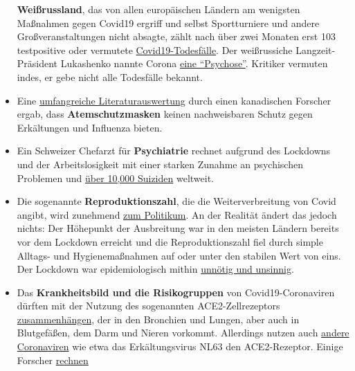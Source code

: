 \begin{itemize}
  \textbf{Weißrussland}, das von allen europäischen Ländern am wenigsten
  Maßnahmen gegen Covid19 ergriff und selbst Sportturniere und andere
  Großveranstaltungen nicht absagte, zählt nach über zwei Monaten erst
  103 testpositive oder vermutete
  \href{https://en.wikipedia.org/wiki/COVID-19_pandemic_in_Belarus}{Covid19-Todesfälle}.
  Der weißrussiche Langzeit-Präsident Lukashenko nannte Corona
  \href{https://www.baltictimes.com/lukashenko__coronavirus_is_psychosis/}{eine
  ``Psychose''}. Kritiker vermuten indes, er gebe nicht alle Todesfälle
  bekannt.
\item
  Eine
  \href{https://covidinfos.net/wp-content/uploads/2020/05/MasksDon-twork-4.pdf}{umfangreiche
  Literaturauswertung} durch einen kanadischen Forscher ergab, dass
  \textbf{Atemschutzmasken} keinen nachweisbaren Schutz gegen
  Erkältungen und Influenza bieten.
\item
  Ein Schweizer Chefarzt für \textbf{Psychiatrie} rechnet aufgrund des
  Lockdowns und der Arbeitslosigkeit mit einer starken Zunahme an
  psychischen Problemen und
  \href{https://www.aargauerzeitung.ch/aargau/kanton-aargau/aargauer-psychiatrie-chefarzt-kawohl-warnt-arbeitslosigkeit-erhoeht-das-suizidrisiko-137742663}{über
  10,000 Suiziden} weltweit.
\item
  Die sogenannte \textbf{Reproduktionszahl}, die die Weiterverbreitung
  von Covid angibt, wird zunehmend
  \href{https://www.tagesschau.de/faktenfinder/corona-reproduktionszahl-101.html}{zum
  Politikum}. An der Realität ändert das jedoch nichts: Der Höhepunkt
  der Ausbreitung war in den meisten Ländern bereits vor dem Lockdown
  erreicht und die Reproduktionszahl fiel durch simple Alltags- und
  Hygienemaßnahmen auf oder unter den stabilen Wert von eins. Der
  Lockdown war epidemiologisch mithin
  \href{https://infekt.ch/2020/04/sind-wir-tatsaechlich-im-blindflug/}{unnötig
  und unsinnig}.
\item
  Das \textbf{Krankheitsbild und die Risikogruppen} von
  Covid19-Coronaviren dürften mit der Nutzung des sogenannten
  ACE2-Zellrezeptors
  \href{https://www.news-medical.net/news/20200420/ACE2-TMPRSS2-profiling-indicates-tissue-vulnerability-to-SARS-CoV-2-infection.aspx}{zusammenhängen},
  der in den Bronchien und Lungen, aber auch in Blutgefäßen, dem Darm
  und Nieren vorkommt. Allerdings nutzen auch
  \href{https://www.ncbi.nlm.nih.gov/pmc/articles/PMC4369385/}{andere
  Coronaviren} wie etwa das Erkältungsvirus NL63 den ACE2-Rezeptor.
  Einige Forscher
  \href{https://www.ncbi.nlm.nih.gov/pmc/articles/PMC7074995/}{rechnen
}
\end{itemize}
